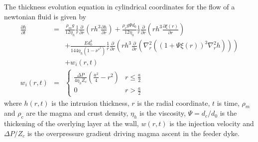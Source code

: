 The thickness  evolution equation  in cylindrical coordinates  for the
flow of a newtonian fluid is given by \citep{Thorey:2014cv}
\begin{eqnarray}
  \frac{\partial         h}{\partial        t}
  &=&\frac{\rho_{m}g}{12  \eta_h} \frac{1}{r}  \frac{\partial}{\partial
      r}\left   (r  h^{3}   \frac{\partial  h}{\partial   r}  \right)+
      \frac{\rho_{c}g\Psi       d_0}{12       \eta_h}       \frac{1}{r}
      \frac{\partial}{\partial r}\left ( r
      h^{3}  \frac{\partial  \xi(r)}{\partial  r}\right )  \nonumber  \\
  &&+ \frac{E d_0^{3}}{144\eta_h
     (1-\nu^*^{2})}\frac{1}{r}\frac{\partial}{\partial  r}\left  (  r
     h^{3}    \frac{\partial}{\partial   r}    \left(\nabla^{2}_{r}
     ((1+\Psi \xi(r))^{3}\nabla^{2}_{r}h )\right)\right )\nonumber\\
  && + w_i(r,t) \label{C6-eq16}\\
  w_i(r,t)&=&
            \begin{cases} \frac{ \Delta P}{4 \eta_h Z_{c}} (\frac{a^{2}}{4}-r^{2})&
              r \le \frac{a}{2}\\ 0 & r > \frac{a}{2}
            \end{cases}
                                      \label{C6-eq12}
\end{eqnarray}
where  $h(r,t)$  is  the  intrusion   thickness,  $r$  is  the  radial
coordinate, $t$ is time, $\rho_m$ and $\rho_c$ are the magma and crust
density, $\eta_h$ is the viscosity,  $\Psi = d_c/d_0$ is the thickening
of the overlying layer at the wall, $w(r,t)$ is the injection velocity
and $\Delta P/Z_c$  is the overpressure gradient  driving magma ascent
in the feeder dyke.

